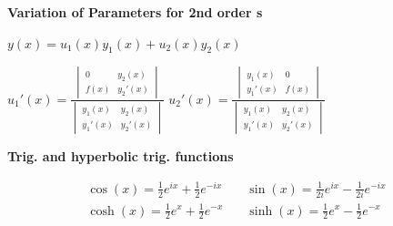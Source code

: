 \begin{minipage}{0.5\linewidth}
\begin{center}
\textbf{Variation of Parameters for 2nd order \ode{}s}

\vspace{1em}

\(y(x) = u_{1}(x) y_{1}(x) + u_{2}(x) y_{2}(x)\)

\(u_{1}'(x) = \frac{
  \begin{vmatrix}
    0 & y_{2}(x) \\
    f(x) & y_{2}'(x)
  \end{vmatrix}
}{  \begin{vmatrix}
    y_{1}(x) & y_{2}(x) \\
    y_{1}'(x) & y_{2}'(x)
  \end{vmatrix}
}\) \hfill \(u_{2}'(x) = \frac{
  \begin{vmatrix}
    y_{1}(x) & 0 \\
    y_{1}'(x) & f(x)
  \end{vmatrix}
}{  \begin{vmatrix}
    y_{1}(x) & y_{2}(x) \\
    y_{1}'(x) & y_{2}'(x)
  \end{vmatrix}
}\)
\end{center}
\end{minipage}\hfill\begin{minipage}{0.28\linewidth}
\begin{center}
\textbf{Trig. and hyperbolic trig. functions}

\vspace{1em}

  \begin{align*}
    \cos(x) = \frac{1}{2}e^{i x} + \frac{1}{2}e^{-i x} &\quad
    \sin(x) = \frac{1}{2i}e^{i x} - \frac{1}{2i}e^{-i x} \\
    \cosh(x) = \frac{1}{2}e^{x} + \frac{1}{2}e^{-x} &\quad
    \sinh(x) = \frac{1}{2}e^{x} - \frac{1}{2}e^{-x}
  \end{align*}
\end{center}

\end{minipage}


